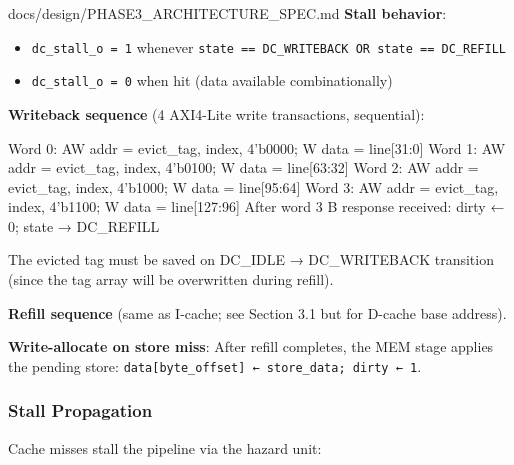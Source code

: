 \begin{relocated}{docs/design/PHASE3_ARCHITECTURE_SPEC.md}
\textbf{Stall behavior}:

\begin{itemize}
\tightlist
\item
  \texttt{dc\_\allowbreak{}stall\_\allowbreak{}o\ =\allowbreak{}\ 1}
  whenever
  \texttt{state\ =\allowbreak{}=\allowbreak{}\ DC\_\allowbreak{}WRITEBACK\ OR\ state\ =\allowbreak{}=\allowbreak{}\ DC\_\allowbreak{}REFILL}
\item
  \texttt{dc\_\allowbreak{}stall\_\allowbreak{}o\ =\allowbreak{}\ 0}
  when hit (data available combinationally)
\end{itemize}

\textbf{Writeback sequence} (4 AXI4-Lite write transactions,
sequential):

\begin{textblock}
Word 0: AW addr = {evict_tag, index, 4'b0000}; W data = line[31:0]
Word 1: AW addr = {evict_tag, index, 4'b0100}; W data = line[63:32]
Word 2: AW addr = {evict_tag, index, 4'b1000}; W data = line[95:64]
Word 3: AW addr = {evict_tag, index, 4'b1100}; W data = line[127:96]
After word 3 B response received: dirty ← 0; state → DC_REFILL
\end{textblock}

The evicted tag must be saved on DC\_IDLE → DC\_\allowbreak{}WRITEBACK
transition (since the tag array will be overwritten during refill).

\textbf{Refill sequence} (same as I-cache; see Section 3.1 but for
D-cache base address).

\textbf{Write-allocate on store miss}: After refill completes, the MEM
stage applies the pending store:
\texttt{data[byte\_\allowbreak{}offset]\ ←\ store\_\allowbreak{}data;\ dirty\ ←\ 1}.

\subsubsection{Stall Propagation}\label{ds:ch:phase3-architecture:33-stall-propagation}

Cache misses stall the pipeline via the hazard unit:


\end{relocated}
